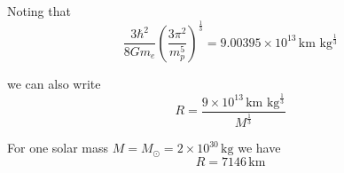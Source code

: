 Noting that
\begin{equation*}
\frac{3\hbar^2}{8Gm_e}\left(\frac{3\pi^2}{m_p^5}\right)^\frac{1}{3}
=9.00395\times10^{13}\,\text{km kg}^\frac{1}{3}\tag{4}
\end{equation*}

we can also write
\begin{equation*}
R=\frac{9\times10^{13}\,\text{km kg}^\frac{1}{3}}{M^{\frac{1}{3}}}
\end{equation*}

For one solar mass $M=M_\odot=2\times10^{30}\,\text{kg}$ we have
\begin{equation*}
R=7146\,\text{km}
\end{equation*}


